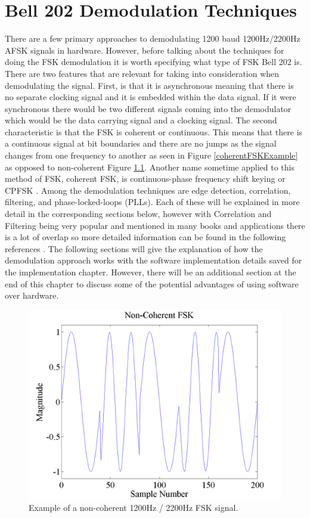 \chapter{Bell 202 Demodulation Techniques}
There are a few primary approaches to demodulating 1200 baud 1200Hz/2200Hz AFSK signals in hardware.  However, before talking about the techniques for doing the FSK demodulation it is worth specifying what type of FSK Bell 202 is. There are two features that are relevant for taking into consideration when demodulating the signal. First, is that it is asynchronous meaning that there is no separate clocking signal and it is embedded within the data signal. If it were synchronous there would be two different signals coming into the demodulator which would be the data carrying signal and a clocking signal. The second characteristic is that the FSK is coherent or continuous. This means that there is a continuous signal at bit boundaries and there are no jumps as the signal changes from one frequency to another as seen in Figure \ref{coherentFSKExample} as opposed to non-coherent Figure \ref{noncoherentFSKExample}. Another name sometime applied to this method of FSK, coherent FSK, is continuous-phase frequency shift keying or CPFSK \cite{WikipediaCPFSK}. Among the demodulation techniques are edge detection, correlation, filtering, and phase-locked-loops (PLLs). Each of these will be explained in more detail in the corresponding sections below, however with Correlation and Filtering being very popular and mentioned in many books and applications there is a lot of overlap so more detailed information can be found in the following references \cite{MarvinK.Simon1995,Sklar1988,J.Das1986,Proakis1983,Siguine2006,Semiconductor}. The following sections will give the explanation of how the demodulation approach works with the software implementation details saved for the implementation chapter. However, there will be an additional section at the end of this chapter to discuss some of the potential advantages of using software over hardware.
\begin{figure}
  \centering
	\includegraphics[width=0.75\linewidth]{images/NonCoherentFSK.png} 
	\caption{Example of a non-coherent 1200Hz / 2200Hz FSK signal.}
   \label{noncoherentFSKExample}
\end{figure}
